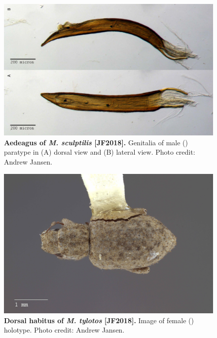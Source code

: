 \documentclass[fleqn,10pt,lineno]{wlpeerj} %
\begin{document}
\begin{figure}[h]
	\centering
	\begin{sideways}
		\includegraphics[width=0.95\textheight]{figure29.jpg}
	\end{sideways}
	\caption{\textbf{Aedeagus of \textit{M. sculptilis} [JF2018].} Genitalia of male (\male) paratype in (A) dorsal view and (B) lateral view. Photo credit: Andrew Jansen.}
	\label{fig:sculptilis_aedeagus}
\end{figure}

\begin{figure}[h]
	\begin{sideways}
		\centering
		\includegraphics[height=\textwidth]{figure30.jpg}
	\end{sideways}
	\caption{\textbf{Dorsal habitus of \textit{M. tylotos} [JF2018].} Image of female (\female) holotype. Photo credit: Andrew Jansen.}
	\label{fig:tylotos_F_dorsal}
\end{figure}
\end{document}
